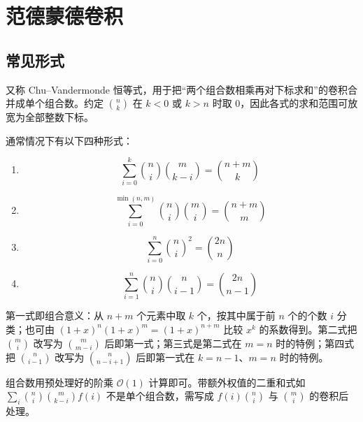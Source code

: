 \section{范德蒙德卷积}

\subsection{常见形式}

又称 Chu--Vandermonde 恒等式，用于把“两个组合数相乘再对下标求和”的卷积合并成单个组合数。约定 $\binom{n}{k}$ 在 $k<0$ 或 $k>n$ 时取 $0$，因此各式的求和范围可放宽为全部整数下标。

通常情况下有以下四种形式：

\begin{enumerate}
    \item $$\sum_{i=0}^{k}\binom{n}{i}\binom{m}{k-i} = \binom{n+m}{k}$$
    \item $$\sum_{i=0}^{\min(n,m)}\binom{n}{i}\binom{m}{i} = \binom{n+m}{m}$$
    \item $$\sum_{i=0}^{n}\binom{n}{i}^{2} = \binom{2n}{n}$$
    \item $$\sum_{i=1}^{n}\binom{n}{i}\binom{n}{i-1} = \binom{2n}{n-1}$$
\end{enumerate}

第一式即组合意义：从 $n+m$ 个元素中取 $k$ 个，按其中属于前 $n$ 个的个数 $i$ 分类；也可由 $(1+x)^{n}(1+x)^{m}=(1+x)^{n+m}$ 比较 $x^{k}$ 的系数得到。第二式把 $\binom{m}{i}$ 改写为 $\binom{m}{m-i}$ 后即第一式；第三式是第二式在 $m=n$ 时的特例；第四式把 $\binom{n}{i-1}$ 改写为 $\binom{n}{n-i+1}$ 后即第一式在 $k=n-1$、$m=n$ 时的特例。

组合数用预处理好的阶乘 $\mathcal{O}(1)$ 计算即可。带额外权值的二重和式如 $\sum_{i}\binom{n}{i}\binom{m}{k-i}f(i)$ 不是单个组合数，需写成 $f(i)\binom{n}{i}$ 与 $\binom{m}{i}$ 的卷积后处理。
